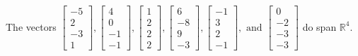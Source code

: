 \begin{exercise}
\begin{exerciseStatement}
  \end{exerciseStatement}
  \begin{exerciseAnswer}
   The vectors \(\left[\begin{array}{r}
-5 \\
2 \\
-3 \\
1
\end{array}\right] , \left[\begin{array}{r}
4 \\
0 \\
-1 \\
-1
\end{array}\right] , \left[\begin{array}{r}
1 \\
2 \\
2 \\
2
\end{array}\right] , \left[\begin{array}{r}
6 \\
-8 \\
9 \\
-3
\end{array}\right] , \left[\begin{array}{r}
-1 \\
3 \\
2 \\
-1
\end{array}\right] , \text{ and } \left[\begin{array}{r}
0 \\
-2 \\
-3 \\
-3
\end{array}\right]\) 
  	 do  
	span \(\mathbb{R}^4\).
  


  \end{exerciseAnswer}
\end{exercise}